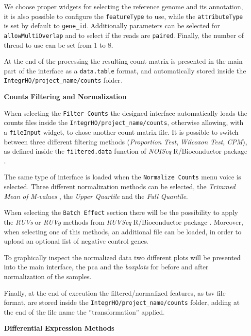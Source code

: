 We choose proper widgets for selecting the reference genome and its annotation, it is also possible to configure the \lstinline!featureType! to use, while the \lstinline!attributeType! is set by default to \lstinline!gene_id!.
Additionally parameters can be selected for \lstinline!allowMultiOverlap! and to select if the reads are \lstinline!paired!.
Finally, the number of thread to use can be set from 1 to 8.

At the end of the processing the resulting count matrix is presented in the main part of the interface as a \lstinline!data.table! format, and automatically stored inside the \lstinline!IntegrHO/project_name/counts! folder.


{\setlength{\parindent}{0cm}\textbf{Counts Filtering and Normalization}}

When selecting the \lstinline!Filter Counts! the designed interface automatically loads the counts files inside the \lstinline!IntegrHO/project_name/counts!, otherwise allowing, with a \lstinline!fileInput! widget, to chose another count matrix file.
It is possible to switch between three different filtering methods (\textit{Proportion Test}, \textit{Wilcoxon Test}, \textit{CPM}), as defined inside the \lstinline!filtered.data! function of \textit{NOISeq} R/Bioconductor package \cite{Tarazona2012}.

The same type of interface is loaded when the \lstinline!Normalize Counts! menu voice is selected.
Three different normalization methods can be selected, the \textit{Trimmed Mean of M-values} \cite{Robinson2010}, the \textit{Upper Quartile} and the \textit{Full Quantile}.

When selecting the \lstinline!Batch Effect! section there will be the possibility to apply the \textit{RUVs} or \textit{RUVg} methods from \textit{RUVSeq} R/Bioconductor package \cite{Risso2014h}.
Moreover, when selecting one of this methods, an additional file can be loaded, in order to upload an optional list of negative control genes.

To graphically inspect the normalized data two different plots will be presented into the main interface, the \gls{pca} and the \textit{boxplots} for before and after normalization of the samples.

Finally, at the end of execution the filtered/normalized features, as \gls{tsv} file format, are stored inside the \lstinline!IntegrHO/project_name/counts! folder, adding at the end of the file name the ''transformation'' applied.


{\setlength{\parindent}{0cm}\textbf{Differential Expression Methods}}

